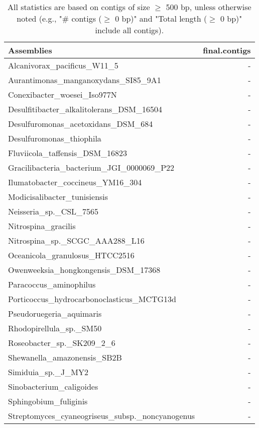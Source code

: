 \documentclass[12pt,a4paper]{article}
\begin{document}
\begin{table}[ht]
\begin{center}
\caption{All statistics are based on contigs of size $\geq$ 500 bp, unless otherwise noted (e.g., "\# contigs ($\geq$ 0 bp)" and "Total length ($\geq$ 0 bp)" include all contigs).}
\begin{tabular}{|l*{1}{|r}|}
\hline
Assemblies & final.contigs \\ \hline
Alcanivorax\_pacificus\_W11\_5 & - \\ \hline
Aurantimonas\_manganoxydans\_SI85\_9A1 & - \\ \hline
Conexibacter\_woesei\_Iso977N & - \\ \hline
Desulfitibacter\_alkalitolerans\_DSM\_16504 & - \\ \hline
Desulfuromonas\_acetoxidans\_DSM\_684 & - \\ \hline
Desulfuromonas\_thiophila & - \\ \hline
Fluviicola\_taffensis\_DSM\_16823 & - \\ \hline
Gracilibacteria\_bacterium\_JGI\_0000069\_P22 & - \\ \hline
Ilumatobacter\_coccineus\_YM16\_304 & - \\ \hline
Modicisalibacter\_tunisiensis & - \\ \hline
Neisseria\_sp.\_CSL\_7565 & - \\ \hline
Nitrospina\_gracilis & - \\ \hline
Nitrospina\_sp.\_SCGC\_AAA288\_L16 & - \\ \hline
Oceanicola\_granulosus\_HTCC2516 & - \\ \hline
Owenweeksia\_hongkongensis\_DSM\_17368 & - \\ \hline
Paracoccus\_aminophilus & - \\ \hline
Porticoccus\_hydrocarbonoclasticus\_MCTG13d & - \\ \hline
Pseudoruegeria\_aquimaris & - \\ \hline
Rhodopirellula\_sp.\_SM50 & - \\ \hline
Roseobacter\_sp.\_SK209\_2\_6 & - \\ \hline
Shewanella\_amazonensis\_SB2B & - \\ \hline
Simiduia\_sp.\_J\_MY2 & - \\ \hline
Sinobacterium\_caligoides & - \\ \hline
Sphingobium\_fuliginis & - \\ \hline
Streptomyces\_cyaneogriseus\_subsp.\_noncyanogenus & - \\ \hline

\end{tabular}
\end{center}
\end{table}
\end{document}
